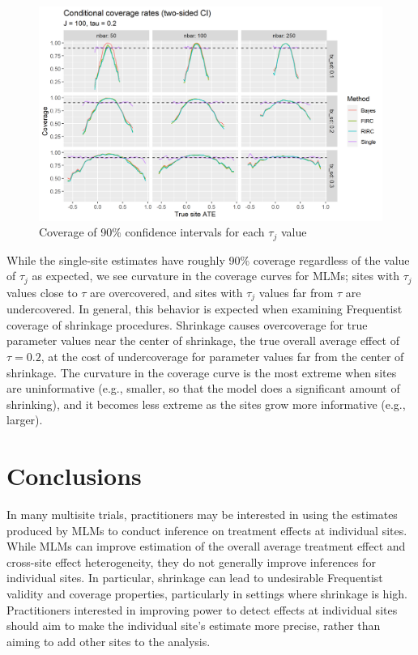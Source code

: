 \documentclass[]{article}
\begin{document}
\begin{figure}[ht]
	\centering
	\includegraphics[width=\textwidth]{coverage_plot}
	\caption{Coverage of 90\% confidence intervals for each $\tau_j$ value}
	\label{fig:coverage_plot}
\end{figure}

While the single-site estimates have roughly 90\% coverage regardless of the value of $\tau_j$ as expected, we see curvature in the coverage curves for MLMs; sites with $\tau_j$ values close to $\tau$ are overcovered, and sites with $\tau_j$ values far from $\tau$ are undercovered.
In general, this behavior is expected when examining Frequentist coverage of shrinkage procedures.
Shrinkage causes overcoverage for true parameter values near the center of shrinkage, the true overall average effect of $\tau=0.2$, at the cost of undercoverage for parameter values far from the center of shrinkage.
The curvature in the coverage curve is the most extreme when sites are uninformative (e.g., smaller, so that the model does a significant amount of shrinking), and it becomes less extreme as the sites grow more informative (e.g., larger).

\section{Conclusions}

In many multisite trials, practitioners may be interested in using the estimates produced by MLMs to conduct inference on treatment effects at individual sites.
While MLMs can improve estimation of the overall average treatment effect and cross-site effect heterogeneity, they do not generally improve inferences for individual sites.
In particular, shrinkage can lead to undesirable Frequentist validity and coverage properties, particularly in settings where shrinkage is high.
Practitioners interested in improving power to detect effects at individual sites should aim to make the individual site's estimate more precise, rather than aiming to add other sites to the analysis.


	
\end{document}
